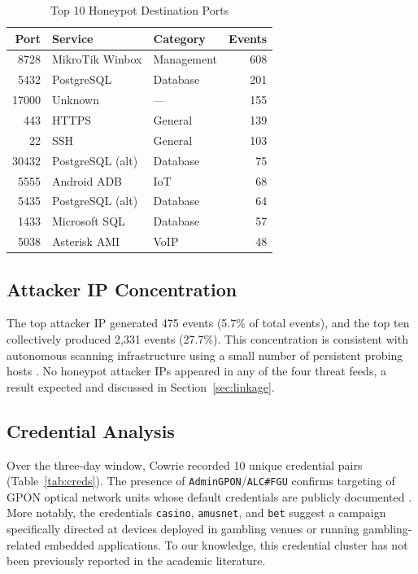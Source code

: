 \documentclass[journal]{IEEEtran}
\begin{document}
\begin{table}[!t]
  \caption{Top 10 Honeypot Destination Ports}
  \label{tab:ports}
  \centering
  \renewcommand{\arraystretch}{1.2}
  \begin{tabular}{@{}rllr@{}}
    \toprule
    Port & Service & Category & Events \\
    \midrule
    8728  & MikroTik Winbox   & Management & 608 \\
    5432  & PostgreSQL        & Database   & 201 \\
    17000 & Unknown           & ---        & 155 \\
    443   & HTTPS             & General    & 139 \\
    22    & SSH               & General    & 103 \\
    30432 & PostgreSQL (alt)  & Database   &  75 \\
    5555  & Android ADB       & IoT        &  68 \\
    5435  & PostgreSQL (alt)  & Database   &  64 \\
    1433  & Microsoft SQL     & Database   &  57 \\
    5038  & Asterisk AMI      & VoIP       &  48 \\
    \bottomrule
  \end{tabular}
\end{table}

\subsection{Attacker IP Concentration}

The top attacker IP generated 475 events (5.7\% of total events), and the top ten
collectively produced 2{,}331 events (27.7\%).
This concentration is consistent with autonomous scanning infrastructure using
a small number of persistent probing hosts \cite{durumeric2015search}.
No honeypot attacker IPs appeared in any of the four threat feeds, a result
expected and discussed in Section~\ref{sec:linkage}.

\subsection{Credential Analysis}

Over the three-day window, Cowrie recorded 10 unique credential pairs
(Table~\ref{tab:creds}).
The presence of \texttt{AdminGPON}/\texttt{ALC\#FGU} confirms targeting of
GPON optical network units whose default credentials are publicly documented
\cite{cetin2019cleaning}.
More notably, the credentials \texttt{casino}, \texttt{amusnet}, and
\texttt{bet} suggest a campaign specifically directed at devices deployed in
gambling venues or running gambling-related embedded applications.
To our knowledge, this credential cluster has not been previously reported in
the academic literature.
\end{document}

